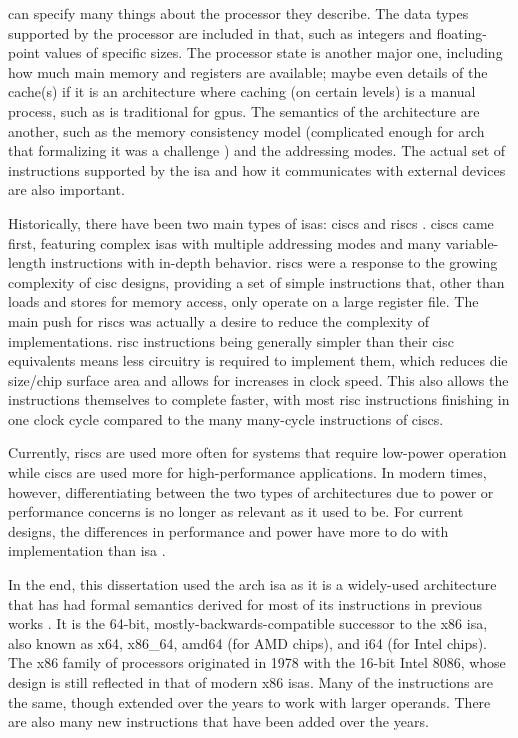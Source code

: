  can specify many things about the processor they describe.
The data types supported by the processor are included in that,
such as integers and floating-point values of specific sizes.
The processor state is another major one, including how much main memory and registers
are available; maybe even details of the cache(s) if it is an architecture
where caching (on certain levels) is a manual process, such as is traditional
for \glspl{gpu}.
The semantics of the architecture are another, such as the memory consistency model
(complicated enough for \gls{arch} that formalizing it was a challenge
\autocite{sewell2010tso,owens2009tso,owens2009tsoextended})
and the addressing modes.
The actual set of instructions supported by the \gls{isa}
and how it communicates with external devices are also important.

Historically, there have been two main types of \glspl{isa}:
\glspl{cisc} and \glspl{risc} \autocite{jamil1995rc}.
\Glspl{cisc} came first, featuring complex \glspl{isa} with multiple addressing modes
and many variable-length instructions with in-depth behavior.
\Glspl{risc} were a response to the growing complexity of \gls{cisc} designs,
providing a set of simple instructions that,
other than loads and stores for memory access, only operate on a large register file.
The main push for \glspl{risc} was actually a desire
to reduce the complexity of implementations. \Gls{risc} instructions being
generally simpler than their \gls{cisc} equivalents
means less circuitry is required to implement them,
which reduces die size/chip surface area and allows for increases in clock speed.
This also allows the instructions themselves to complete faster,
with most \gls{risc} instructions finishing in one clock cycle
compared to the many many-cycle instructions of \glspl{cisc}.

Currently, \glspl{risc} are used more often for systems that require
low-power operation while \glspl{cisc} are used more for high-performance applications.
In modern times, however, differentiating between the two types of architectures
due to power or performance concerns is no longer as relevant as it used to be.
For current designs, the differences in performance and power
have more to do with implementation than \gls{isa} \autocite{blem2013struggles}.

In the end,
this dissertation used the \gls{arch} \gls{isa} as it is a widely-used architecture
that has had formal semantics derived for most of its instructions
in previous works \autocite{heule2016stratified,roessle2019verified}.
It is the 64-bit, mostly-backwards-compatible successor to the \gls{x86} \gls{isa},
also known as \gls{x64}, \gls{x86_64}, \gls{amd64} (for AMD chips), and \gls{i64} (for Intel chips).
The \gls{x86} family of processors originated in 1978 with the 16-bit Intel 8086,
whose design is still reflected in that of modern \gls{x86} \glspl{isa}.
Many of the instructions are the same,
though extended over the years to work with larger operands.
There are also many new instructions that have been added over the years.

